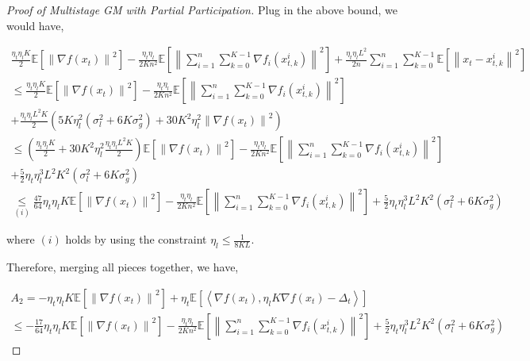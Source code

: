 \begin{proof}[Proof of Multistage GM with Partial Participation]
Plug in the above bound, we would have,


\begin{equation}
\begin{gathered}
\frac{\eta_t \eta_l K}{2}\mathbb{E} \left[ \left\|\nabla f(x_t)\right\|^2 \right]-\frac{\eta_t\eta_l}{2Kn^2}\mathbb{E}\left[\left\| \sum_{i=1}^n\sum_{k=0}^{K-1}\nabla f_i(x^i_{t,k})\right\|^2\right]+\frac{\eta_t\eta_l L^2}{2 n }\sum_{i=1}^n\sum_{k=0}^{K-1}\mathbb{E}\left[\left\| x_t-x_{t,k}^i\right\|^2\right]\\
\leq \frac{\eta_t \eta_l K}{2}\mathbb{E} \left[ \left\|\nabla f(x_t)\right\|^2 \right]-\frac{\eta_t\eta_l}{2Kn^2}\mathbb{E}\left[\left\| \sum_{i=1}^n\sum_{k=0}^{K-1}\nabla f_i(x^i_{t,k})\right\|^2\right]\\
+\frac{\eta_t\eta_l L^2 K}{2 } \left(5K\eta_l^2\left(\sigma_l^2+6K\sigma_g^2\right)+30K^2\eta_l^2\left\|\nabla f(x_t)\right\|^2\right) \\
\le \left(\frac{\eta_t \eta_l K}{2}+30K^2\eta_l^2 \frac{\eta_t\eta_l L^2 K }{2}\right)\mathbb{E} \left[ \left\|\nabla f(x_t)\right\|^2 \right]-\frac{\eta_t\eta_l}{2Kn^2}\mathbb{E}\left[\left\| \sum_{i=1}^n\sum_{k=0}^{K-1}\nabla f_i(x^i_{t,k})\right\|^2\right]\\
+\frac{5}{2}\eta_t\eta_l^3L^2K^2\left(\sigma_l^2+6K\sigma_g^2\right)\\
\underset{(i)}{\leq} \frac{47}{64}\eta_t \eta_l K\mathbb{E} \left[ \left\|\nabla f(x_t)\right\|^2 \right]-\frac{\eta_t\eta_l}{2Kn^2}\mathbb{E}\left[\left\| \sum_{i=1}^n\sum_{k=0}^{K-1}\nabla f_i(x^i_{t,k})\right\|^2\right]+\frac{5}{2}\eta_t\eta_l^3L^2K^2\left(\sigma_l^2+6K\sigma_g^2\right)
\end{gathered}\nonumber
\end{equation}

where $(i)$ holds by using the constraint $\eta_l\le\frac{1}{8KL}$.

Therefore, merging all pieces together, we have,

\begin{equation}
\begin{gathered}
A_2 =-\eta_t \eta_l K \mathbb{E}\left [\left\| \nabla f\left(x_t\right) \right\|^2\right]+\eta_t\mathbb{E}\left[\left\langle \nabla f\left(x_t\right), \eta_l K \nabla f\left(x_t\right) - \Delta_t \right\rangle\right]\\
\le -\frac{17}{64}\eta_t \eta_l K \mathbb{E}\left [\left\| \nabla f\left(x_t\right) \right\|^2\right] - \frac{\eta_t\eta_l}{2Kn^2}\mathbb{E}\left[\left\| \sum_{i=1}^n\sum_{k=0}^{K-1}\nabla f_i(x^i_{t,k})\right\|^2\right]+\frac{5}{2}\eta_t\eta_l^3L^2K^2\left(\sigma_l^2+6K\sigma_g^2\right)
\end{gathered}\nonumber
\end{equation}


\end{proof}
